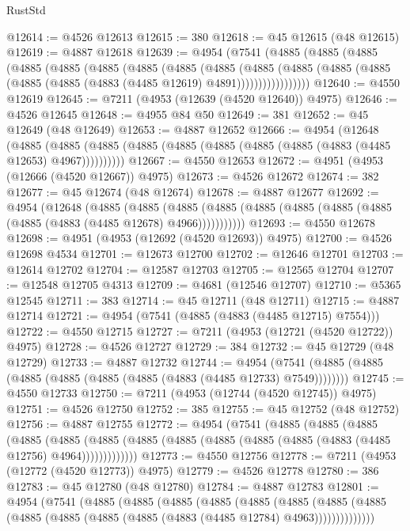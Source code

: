 \begin{lexlean}{RustStd}
\begin{coremodule}
@12614 := @4526 @12613
@12615 := 380
@12618 := @45 @12615 (@48 @12615)
@12619 := @4887 @12618
@12639 := @4954
    (@7541
      (@4885
        (@4885
          (@4885
            (@4885
              (@4885
                (@4885
                  (@4885
                    (@4885
                      (@4885
                        (@4885
                          (@4885
                            (@4885 (@4885 (@4885 (@4885 (@4883 (@4485 @12619) @4891)))))))))))))))))
@12640 := @4550 @12619
@12645 := @7211 (@4953 (@12639 (@4520 @12640)) @4975)
@12646 := @4526 @12645
@12648 := @4955 @84 @50
@12649 := 381
@12652 := @45 @12649 (@48 @12649)
@12653 := @4887 @12652
@12666 := @4954
    (@12648
      (@4885 (@4885 (@4885 (@4885 (@4885 (@4885 (@4885 (@4885 (@4883 (@4485 @12653) @4967))))))))))
@12667 := @4550 @12653
@12672 := @4951 (@4953 (@12666 (@4520 @12667)) @4975)
@12673 := @4526 @12672
@12674 := 382
@12677 := @45 @12674 (@48 @12674)
@12678 := @4887 @12677
@12692 := @4954
    (@12648
      (@4885
        (@4885
          (@4885 (@4885 (@4885 (@4885 (@4885 (@4885 (@4885 (@4883 (@4485 @12678) @4966)))))))))))
@12693 := @4550 @12678
@12698 := @4951 (@4953 (@12692 (@4520 @12693)) @4975)
@12700 := @4526 @12698 @4534
@12701 := @12673 @12700
@12702 := @12646 @12701
@12703 := @12614 @12702
@12704 := @12587 @12703
@12705 := @12565 @12704
@12707 := @12548 @12705 @4313
@12709 := @4681 (@12546 @12707)
@12710 := @5365 @12545
@12711 := 383
@12714 := @45 @12711 (@48 @12711)
@12715 := @4887 @12714
@12721 := @4954 (@7541 (@4885 (@4883 (@4485 @12715) @7554)))
@12722 := @4550 @12715
@12727 := @7211 (@4953 (@12721 (@4520 @12722)) @4975)
@12728 := @4526 @12727
@12729 := 384
@12732 := @45 @12729 (@48 @12729)
@12733 := @4887 @12732
@12744 := @4954 (@7541 (@4885 (@4885 (@4885 (@4885 (@4885 (@4885 (@4883 (@4485 @12733) @7549))))))))
@12745 := @4550 @12733
@12750 := @7211 (@4953 (@12744 (@4520 @12745)) @4975)
@12751 := @4526 @12750
@12752 := 385
@12755 := @45 @12752 (@48 @12752)
@12756 := @4887 @12755
@12772 := @4954
    (@7541
      (@4885
        (@4885
          (@4885
            (@4885
              (@4885
                (@4885 (@4885 (@4885 (@4885 (@4885 (@4885 (@4883 (@4485 @12756) @4964)))))))))))))
@12773 := @4550 @12756
@12778 := @7211 (@4953 (@12772 (@4520 @12773)) @4975)
@12779 := @4526 @12778
@12780 := 386
@12783 := @45 @12780 (@48 @12780)
@12784 := @4887 @12783
@12801 := @4954
    (@7541
      (@4885
        (@4885
          (@4885
            (@4885
              (@4885
                (@4885
                  (@4885
                    (@4885 (@4885 (@4885 (@4885 (@4885 (@4883 (@4485 @12784) @4963))))))))))))))

\end{coremodule}
\end{lexlean}
